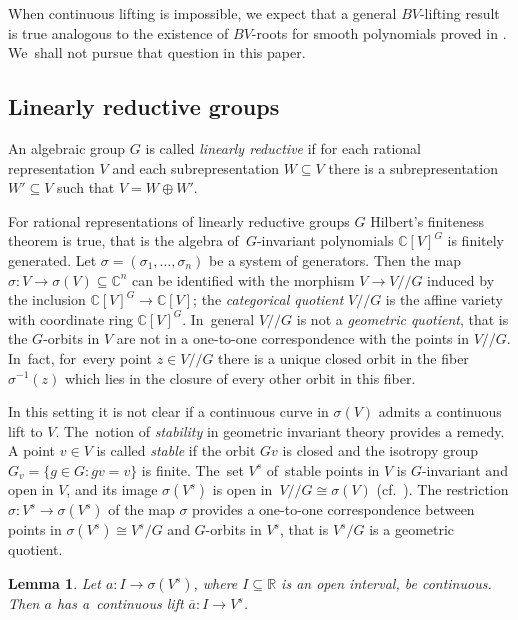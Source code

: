 \documentclass[pdftex]{sigma}
\numberwithin{equation}{section}
\newtheorem{Lemma}[Theorem]{Lemma}
\def\si{\sigma}
\def\C{\mathbb{C}}
\def\R{\mathbb{R}}
\def\ol{\overline}
\def\cq{{/\!\!/}}
\begin{document}
When continuous lifting is impossible,
we expect that a general $BV$-lifting result is true analogous to the existence of $BV$-roots
for smooth polynomials proved in \cite{Parusinski:2020aa}. We~shall not pursue that question in this paper.

\subsection{Linearly reductive groups}

An algebraic group $G$ is called \emph{linearly reductive} if for each rational representation
$V$ and each subrepresentation $W \subseteq V$ there is a subrepresentation $W' \subseteq V$ such that
$V = W \oplus W'$.

For rational representations of linearly reductive groups $G$ Hilbert's finiteness theorem is true,
that is the algebra of~$G$-invariant polynomials $\C[V]^G$ is finitely generated. Let $\si=(\si_1,\dots, \si_n)$ be a system of generators.
Then the map $\si \colon V \to \si(V) \subseteq \C^n$ can be identified with the morphism $V \to V\cq G$ induced by the
inclusion $\C[V]^G \to \C[V]$; the \emph{categorical quotient} $V\cq G$ is the affine variety with
coordinate ring $\C[V]^G$. In~general $V\cq G$ is not a \emph{geometric quotient}, that is the
$G$-orbits in $V$ are not in a one-to-one correspondence with the points in $V\cq G$. In~fact,
for~every point $z \in V\cq G$ there is a unique closed orbit in the fiber $\si^{-1}(z)$ which lies in the
closure of every other orbit in this fiber.

In this setting it is not clear if a continuous curve in $\si(V)$ admits a continuous lift to $V$. The~notion of \emph{stability} in geometric invariant theory provides a remedy.
A point $v \in V$ is called \emph{stable} if the orbit $Gv$ is closed and the isotropy group
$G_v = \{g \in G \colon gv=v\}$ is finite.
The~set $V^s$ of~stable points in $V$ is $G$-invariant and open in $V$,
and its image $\si(V^s)$ is open in~$V\cq G \cong \si(V)$ (cf.\ \cite[Proposition 5.15]{Mukai:2003aa}).
The restriction $\si \colon V^s \to \si(V^s)$ of the map $\si$ provides a one-to-one correspondence
between points in $\si(V^s) \cong V^s/G$ and $G$-orbits in $V^s$, that is $V^s/G$ is a geometric quotient.


\begin{Lemma}
 Let $a \colon I \to \si(V^s)$, where $I \subseteq \R$ is an open interval, be continuous.
 Then $a$ has a~con\-tinuous lift $\ol a \colon I \to V^s$.
\end{Lemma}
\end{document}
